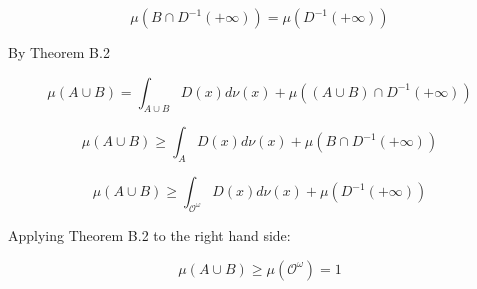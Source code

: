 \documentclass[a4paper]{article}
\newcommand{\Obs}{\mathcal{O}}
\newcommand{\ObsO}{\Obs^\omega}
\begin{document}
$$\mu(B \cap D^{-1}(+\infty)) = \mu(D^{-1}(+\infty))$$

By Theorem B.2

$$\mu(A \cup B) = \int_{A \cup B} D(x) d\nu(x) + \mu((A \cup B) \cap D^{-1}(+\infty))$$

$$\mu(A \cup B) \geq \int_{A} D(x) d\nu(x) + \mu(B \cap D^{-1}(+\infty))$$

$$\mu(A \cup B) \geq \int_{\ObsO} D(x) d\nu(x) + \mu(D^{-1}(+\infty))$$

Applying Theorem B.2 to the right hand side:

$$\mu(A \cup B) \geq \mu(\ObsO) = 1$$
\end{document}
